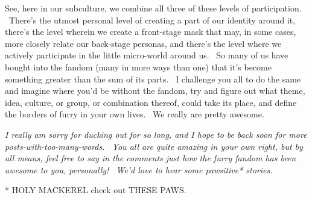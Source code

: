 See, here in our subculture, we combine all three of these levels of
participation. ~There's the utmost personal level of creating a part of
our identity around it, there's the level wherein we create a
front-stage mask that may, in some cases, more closely relate our
back-stage personas, and there's the level where we actively participate
in the little micro-world around us. ~So many of us have bought into the
fandom (many in more ways than one) that it's become something greater
than the sum of its parts. ~I challenge you all to do the same and
imagine where you'd be without the fandom, try and figure out what
theme, idea, culture, or group, or combination thereof, could take its
place, and define the borders of furry in your own lives. ~We really are
pretty awesome.

\emph{I really am sorry for ducking out for so long, and I hope to be
back soon for more posts-with-too-many-words. ~You all are quite amazing
in your own right, but by all means, feel free to say in the comments
just how the furry fandom has been awesome to you, personally! ~We'd
love to hear some pawsitive* stories.}

* HOLY MACKEREL check out THESE PAWS.
